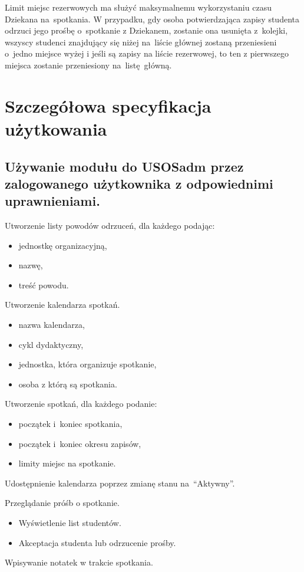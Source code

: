 \documentclass[licencjacka]{pracamgr}
\begin{document}
Limit miejsc rezerwowych ma służyć maksymalnemu wykorzystaniu czasu Dziekana na~spotkania. W przypadku, gdy osoba potwierdzająca zapisy studenta odrzuci jego prośbę o~spotkanie z Dziekanem, zostanie ona usunięta z~kolejki, wszyscy studenci znajdujący się niżej na~liście głównej zostaną przeniesieni o~jedno miejsce wyżej i jeśli są zapisy na liście rezerwowej, to ten z pierwszego miejsca zostanie przeniesiony na~listę~główną.

\section{Szczegółowa specyfikacja użytkowania}

\subsection{Używanie modułu do USOSadm przez zalogowanego użytkownika z odpowiednimi uprawnieniami.}
	\begin{step}
			\item Utworzenie listy powodów odrzuceń, dla każdego podając:
					\begin{itemize}
						\item jednostkę organizacyjną,
						\item nazwę,
						\item treść powodu.
					\end{itemize}
			\item Utworzenie kalendarza spotkań.
					\begin{itemize}
						\item nazwa kalendarza,
						\item cykl dydaktyczny,
						\item jednostka, która organizuje spotkanie,
						\item osoba z którą są spotkania.
					\end{itemize} 
				\item Utworzenie spotkań, dla każdego podanie:
					\begin{itemize}
						\item początek i~koniec spotkania,
						\item początek i~koniec okresu zapisów,
						\item limity miejsc na spotkanie.
					\end{itemize}
		\item Udostępnienie kalendarza poprzez zmianę stanu na~\enquote{Aktywny}.
		\item Przeglądanie próśb o spotkanie.
			\begin{itemize}
				\item Wyświetlenie list studentów.
				\item Akceptacja studenta lub odrzucenie prośby.
			\end{itemize}
		\item Wpisywanie notatek w trakcie spotkania.
	\end{step}
	
\end{document}
